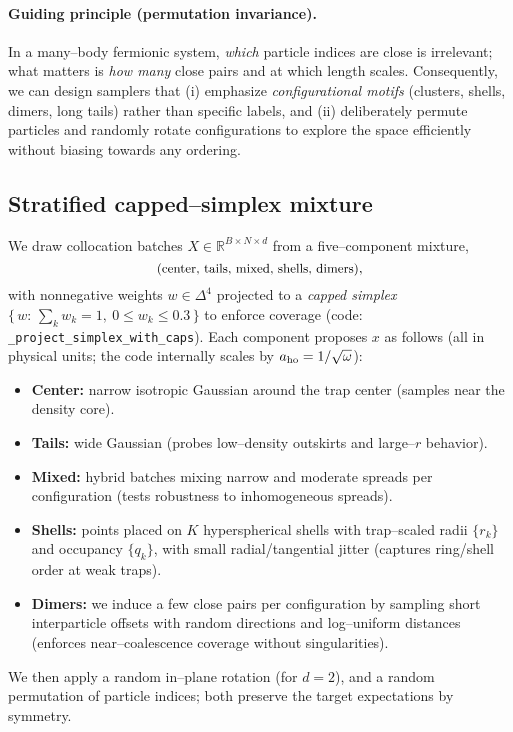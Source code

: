 \paragraph{Guiding principle (permutation invariance).}
In a many–body fermionic system, \emph{which} particle indices are close is irrelevant; what matters is \emph{how many} close pairs and at which length scales. Consequently, we can design samplers that (i) emphasize \emph{configurational motifs} (clusters, shells, dimers, long tails) rather than specific labels, and (ii) deliberately permute particles and randomly rotate configurations to explore the space efficiently without biasing towards any ordering.

\subsection{Stratified capped–simplex mixture}
We draw collocation batches $X\in\mathbb{R}^{B\times N\times d}$ from a five–component mixture,
\[
\text{\small(center, tails, mixed, shells, dimers)},
\]
with nonnegative weights $w\in\Delta^4$ projected to a \emph{capped simplex} $\{\,w:\, \sum_k w_k=1,\ 0\le w_k\le 0.3\,\}$ to enforce coverage (code: \texttt{\_project\_simplex\_with\_caps}).
Each component proposes $x$ as follows (all in physical units; the code internally scales by $a_{\rm ho}=1/\sqrt{\omega}$):
\begin{itemize}
  \item \textbf{Center:} narrow isotropic Gaussian around the trap center (samples near the density core).
  \item \textbf{Tails:} wide Gaussian (probes low–density outskirts and large–$r$ behavior).
  \item \textbf{Mixed:} hybrid batches mixing narrow and moderate spreads per configuration (tests robustness to inhomogeneous spreads).
  \item \textbf{Shells:} points placed on $K$ hyperspherical shells with trap–scaled radii $\{r_k\}$ and occupancy $\{q_k\}$, with small radial/tangential jitter (captures ring/shell order at weak traps).
  \item \textbf{Dimers:} we induce a few close pairs per configuration by sampling short interparticle offsets with random directions and log–uniform distances (enforces near–coalescence coverage without singularities).
\end{itemize}
We then apply a random in–plane rotation (for $d=2$), and a random permutation of particle indices; both preserve the target expectations by symmetry.

